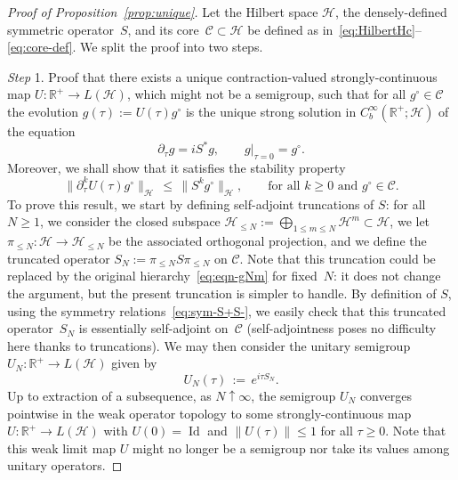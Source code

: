 \documentclass[a4paper,11pt,reqno,noindent]{amsart}
\theoremstyle{plain}
\numberwithin{equation}{section}
\newcommand{\R}{\mathbb R}
\newcommand{\Cc}{\mathcal C}
\newcommand{\Hc}{\mathcal H}
\newcommand{\Id}{\operatorname{Id}}
\newcommand{\3}{|\!|\!|}
\newcommand{\step}[1]{\noindent \textit{Step} #1.}
\begin{document}
\begin{proof}[Proof of Proposition~\ref{prop:unique}]
Let the Hilbert space $\Hc$, the densely-defined symmetric operator~$S$, and its core~$\Cc\subset\Hc$ be defined as in~\eqref{eq:HilbertHc}--\eqref{eq:core-def}. We split the proof into two steps.

\medskip
\step1 Proof that there exists a unique contraction-valued strongly-continuous map \mbox{$U:\R^+\to L(\Hc)$}, which might not be a semigroup, such that for all $g^\circ\in\Cc$ the evolution $g(\tau):=U(\tau)g^\circ$ is the unique strong solution in $C^\infty_b(\R^+;\Hc)$ of the equation
\begin{equation}\label{eq:limS*eqnpr}
\partial_\tau g=iS^*g,\qquad g|_{\tau=0}=g^\circ.
\end{equation}
Moreover, we shall show that it satisfies the stability property
\begin{equation}\label{eq:g-dtCinfty-apriori}
\|\partial_\tau^kU(\tau)g^\circ\|_\Hc\,\le\,\|S^kg^\circ\|_\Hc,\qquad\text{for all $k\ge0$ and $g^\circ\in\Cc$}.
\end{equation}
To prove this result, we start by defining self-adjoint truncations of $S$:
for all~$N\ge1$, we consider the closed subspace $\Hc_{\le N}:=\bigoplus_{1\le m\le N}\Hc^m\subset\Hc$, we let $\pi_{\le N}:\Hc\to\Hc_{\le N}$ be the associated orthogonal projection, and we define the truncated operator $S_N:=\pi_{\le N}S\pi_{\le N}$ on $\Cc$.
Note that this truncation could be replaced by the original hierarchy~\eqref{eq:eqn-gNm} for fixed~$N$: it does not change the argument, but the present truncation is simpler to handle.
By definition of $S$, using the symmetry relations~\eqref{eq:sym-S+S-}, we easily check that this truncated operator~$S_N$ is essentially self-adjoint on~$\Cc$ (self-adjointness poses no difficulty here thanks to truncations).
We may then consider the unitary semigroup $U_N:\R^+\to L(\Hc)$ given by
\[U_N(\tau)\,:=\,e^{i\tau S_N}.\]
Up to extraction of a subsequence, as $N\uparrow\infty$,
the semigroup $U_N$ converges pointwise in the weak operator topology to some strongly-continuous map $U:\R^+\to L(\Hc)$ with $U(0)=\Id$ and $\|U(\tau)\|\le1$ for all $\tau\ge0$. Note that this weak limit map $U$ might no longer be a semigroup nor take its values among unitary operators.


\end{proof}
\end{document}
